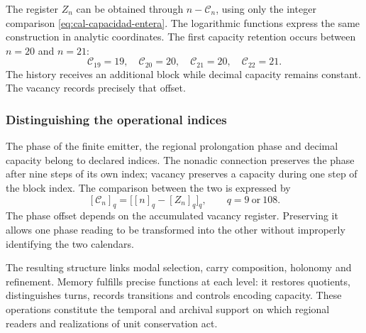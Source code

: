 The register $Z_n$ can be obtained through $n-\mathcal C_n$,
using only the integer comparison
\eqref{eq:cal-capacidad-entera}. The logarithmic functions express
the same construction in analytic coordinates. The first capacity
retention occurs between $n=20$ and $n=21$:
\[
 \mathcal C_{19}=19,\quad\mathcal C_{20}=20,\quad
 \mathcal C_{21}=20,\quad\mathcal C_{22}=21.
\]
The history receives an additional block while decimal capacity
remains constant. The vacancy records precisely that offset.

\subsubsection{Distinguishing the operational indices}

The phase of the finite emitter, the regional prolongation phase and decimal
capacity belong to declared indices. The nonadic connection preserves
the phase after nine steps of its own index; vacancy preserves a
capacity during one step of the block index. The comparison between
the two is expressed by
\[
 [\mathcal C_n]_q=\bigl[[n]_q-[Z_n]_q\bigr]_q,
 \qquad q=9\ \text{or}\ 108.
\]
The phase offset depends on the accumulated vacancy register. Preserving it
allows one phase reading to be transformed into the other without improperly
identifying the two calendars.

The resulting structure links modal selection, carry composition,
holonomy and refinement. Memory fulfills precise functions at each
level: it restores quotients, distinguishes turns, records transitions and
controls encoding capacity. These operations constitute the
temporal and archival support on which regional readers
and realizations of unit conservation act.
